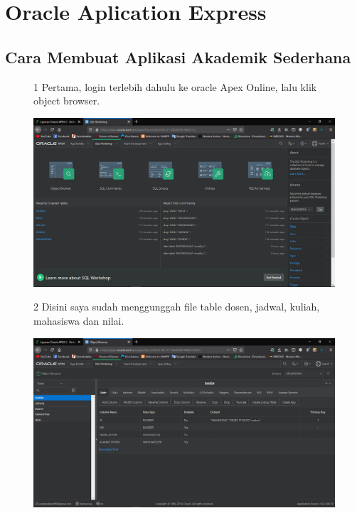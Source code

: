 \chapter{Oracle Aplication Express}

\section{Cara Membuat Aplikasi Akademik Sederhana}

\begin{enumerate}





\begin{figure}[!htbp]
\item[1] Pertama, login terlebih dahulu ke oracle Apex Online, lalu klik object browser.
    \begin{center}
    \includegraphics[scale=0.3]{figures/Screenshot(43).png}
    \end{center}
    \end{figure}
    
\begin{figure}[!htbp]
\item[2] Disini saya sudah menggunggah file table dosen, jadwal, kuliah, mahasiswa dan nilai.
\begin{center}
    \includegraphics[scale=0.3]{figures/Screenshot(44).png}
    \end{center}
    \end{figure}
    

\end{enumerate}
